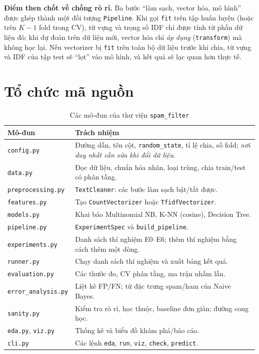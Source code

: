 \textbf{Điểm then chốt về chống rò rỉ.} Ba bước ``làm sạch, vector hóa, mô hình'' được ghép thành một đối tượng \texttt{Pipeline}. Khi gọi \texttt{fit} trên tập huấn luyện (hoặc trên $K-1$ fold trong CV), từ vựng và trọng số IDF chỉ được tính từ phần dữ liệu đó; khi dự đoán trên dữ liệu mới, vector hóa chỉ \textit{áp dụng} (\texttt{transform}) mà không học lại. Nếu vectorizer bị \texttt{fit} trên toàn bộ dữ liệu trước khi chia, từ vựng và IDF của tập test sẽ ``lọt'' vào mô hình, và kết quả sẽ lạc quan hơn thực tế.

\section{Tổ chức mã nguồn}

\begin{table}[H]
\centering
\caption{Các mô-đun của thư viện \texttt{spam\_filter}}
\label{tab:modules}
\begin{tabular}{|p{3.6cm}|p{10.4cm}|}
\hline
\textbf{Mô-đun} & \textbf{Trách nhiệm} \\
\hline
\texttt{config.py} & Đường dẫn, tên cột, \texttt{random\_state}, tỉ lệ chia, số fold; \textit{nơi duy nhất cần sửa khi đổi dữ liệu}. \\
\hline
\texttt{data.py} & Đọc dữ liệu, chuẩn hóa nhãn, loại trùng, chia train/test có phân tầng. \\
\hline
\texttt{preprocessing.py} & \texttt{TextCleaner}: các bước làm sạch bật/tắt được. \\
\hline
\texttt{features.py} & Tạo \texttt{CountVectorizer} hoặc \texttt{TfidfVectorizer}. \\
\hline
\texttt{models.py} & Khai báo Multinomial NB, K-NN (cosine), Decision Tree. \\
\hline
\texttt{pipeline.py} & \texttt{ExperimentSpec} và \texttt{build\_pipeline}. \\
\hline
\texttt{experiments.py} & Danh sách thí nghiệm E0--E6; thêm thí nghiệm bằng cách thêm một dòng. \\
\hline
\texttt{runner.py} & Chạy danh sách thí nghiệm và xuất bảng kết quả. \\
\hline
\texttt{evaluation.py} & Các thước đo, CV phân tầng, ma trận nhầm lẫn. \\
\hline
\texttt{error\_analysis.py} & Liệt kê FP/FN; từ đặc trưng spam/ham của Naive Bayes. \\
\hline
\texttt{sanity.py} & Kiểm tra rò rỉ, học thuộc, baseline đơn giản; đường cong học. \\
\hline
\texttt{eda.py}, \texttt{viz.py} & Thống kê và biểu đồ khám phá/báo cáo. \\
\hline
\texttt{cli.py} & Các lệnh \texttt{eda}, \texttt{run}, \texttt{viz}, \texttt{check}, \texttt{predict}. \\
\hline
\end{tabular}
\end{table}

